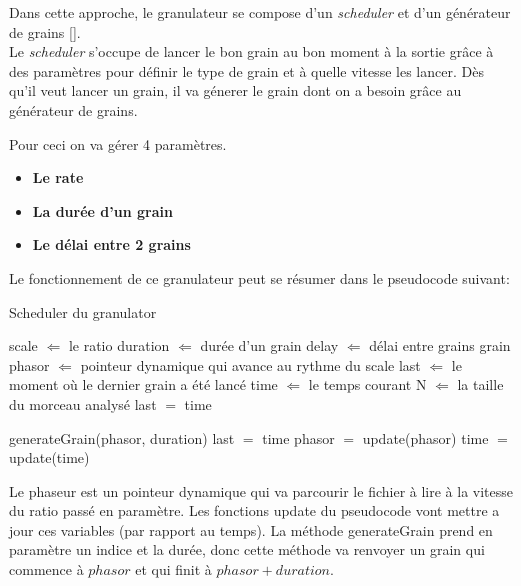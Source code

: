 \documentclass[letterpaper]{article}
\begin{document}
  Dans cette approche, le granulateur se compose d'un \emph{scheduler} et d'un
  générateur de grains [\cite{RealTimeGrainsTSM}].\\
  Le \emph{scheduler} s'occupe de lancer le bon grain au bon moment à la sortie grâce à des paramètres
  pour définir le type de grain et à quelle vitesse les lancer. Dès qu'il veut lancer un grain, il
  va génerer le grain dont on a besoin grâce au générateur de grains.

  Pour ceci on va gérer 4 paramètres.
  \begin{itemize}
  \item \textbf{Le rate}
  \item \textbf{La durée d'un grain}
  \item \textbf{Le délai entre 2 grains}
  \end{itemize}

  Le fonctionnement de ce granulateur peut se résumer dans le pseudocode suivant:
\begin{algorithm}                      %
\caption{Scheduler du granulator}      %
\label{alg:granulator}                 %
\begin{algorithmic}                    %

\STATE scale $\Leftarrow$ le ratio  
\STATE duration $\Leftarrow$ durée d'un grain
\STATE delay $\Leftarrow$ délai entre grains grain 
\STATE phasor $\Leftarrow$ pointeur dynamique qui avance au rythme du scale
\STATE last $\Leftarrow$ le moment où le dernier grain a été lancé
\STATE time $\Leftarrow$ le temps courant
\STATE N $\Leftarrow$ la taille du morceau analysé
\STATE last $=$ time


\STATE generateGrain(phasor, duration)
\STATE last $=$ time
\ENDIF
\STATE phasor $=$ update(phasor)
\STATE time $=$ update(time)
\ENDWHILE
  \end{algorithmic}
\end{algorithm}

Le phaseur est un pointeur dynamique qui va parcourir le fichier à lire à la vitesse du ratio passé
en paramètre. Les fonctions update du pseudocode vont mettre a jour ces variables (par rapport au
temps). La méthode generateGrain prend en paramètre un indice et la durée, donc cette méthode va
renvoyer un grain qui commence à $phasor$ et qui finit à $phasor+duration$.
\end{document}
